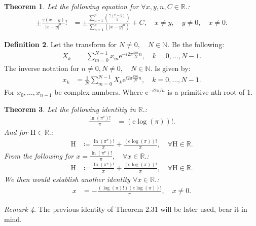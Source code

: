 \documentclass[10pt]{article}
\theoremstyle{plain}
\newtheorem{theorem}{Theorem}[section]
\theoremstyle{definition}
\newtheorem{definition}[theorem]{Definition}
\theoremstyle{remark}
\newtheorem{remark}[theorem]{Remark}
\begin{document}
\begin{theorem}
	Let the following equation for $\forall x, y, n, C \in \mathbb{R}.$:
	\begin{align*}
		\pm \frac{\gamma(x-y)}{|x - y|^{n}}! &= \pm \frac{\sum_{n=1}^{p}(\frac{\gamma(x-y)}{1})}{\sum_{n=1}^{p}(|x - y|^{n})} + C, \quad x \neq y, \quad y \neq 0, \quad x \neq 0.
	\end{align*}
\end{theorem}

\begin{definition}
	Let the transform for $N \neq 0, \quad N \in \mathbb{N}.$ Be the following:
	\begin{align*}
		X_k &= \sum_{m=0}^{N-1} x_{m}\mathrm{e}^{-i2\pi \frac{km}{N}n}, \quad k = 0,\dots,N-1.
	\end{align*}
	The inverse notation for $n \neq 0, N \neq 0, \quad N \in \mathbb{N}.$ Is given by:
	\begin{align*}
		x_k &= \frac{1}{N} \sum_{m=0}^{N-1} X_k \mathrm{e}^{i2\pi \frac{km}{N}n}, \quad k = 0,\dots,N-1.
	\end{align*}
	For $x_{0}, \dots, x_{n-1}$ be complex numbers. Where $\mathrm{e}^{-i2\pi /n}$ is a primitive nth root of 1.
\end{definition}

\begin{theorem}
	Let the following identitiy in $\mathbb{R}.$:
	\begin{align*}
		\frac{\ln(\pi^\mathrm{e})!}{\pi} &= (\mathrm{e} \log(\pi))!.
	\end{align*}
	And for $\mathrm{H} \in \mathbb{R}.$:
	\begin{align*}
		\mathrm{H} &\coloneq \frac{\ln(\pi^\mathrm{e})!}{\pi} + \frac{(\mathrm{e} \log(\pi))!}{\pi}, \quad \forall \mathrm{H} \in \mathbb{R}.
	\end{align*}
	From the following for $x = \frac{\ln(\pi^\mathrm{e})!}{\pi}, \quad \forall x \in \mathbb{R}.$:
	\begin{align*}
	\mathrm{H} &\coloneq \frac{\ln(\pi^\mathrm{e})!}{\pi} + \frac{(\mathrm{e} \log(\pi))!}{\pi}, \quad \forall \mathrm{H} \in \mathbb{R}.
	\end{align*}
	We then would establish another identity $\forall x \in \mathbb{R}.$:
	\begin{align*}
		x &= -\frac{(\log(\pi)!) (e \log(\pi))!}{\pi}, \quad x \neq 0.
	\end{align*}
\end{theorem}
\begin{remark}
	The previous identity of Theorem 2.31 will be later used, bear it in mind.
\end{remark}
\end{document}
